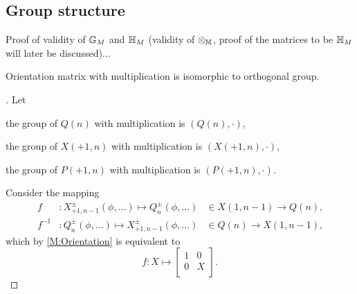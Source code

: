 \documentclass[stu, babel, american, biblatex, a4paper, leqno, draftall]{apa7}
\begin{document}
\subsection{Group structure}
Proof of validity of $\mathbb{G}_{M}$ and $\mathbb{H}_{M}$ (validity of $\otimes_{\mathbb{M}}$, proof of the matrices to be $\mathbb{H}_{M}$ will later be discussed)...
\begin{lemma}\label{M:Orientation:Group}
    Orientation matrix with multiplication
    is isomorphic to orthogonal group.
\end{lemma}
\begin{proof}[]
    Let
    \begin{APAitemize}
        \item the group of $Q\left(n\right)$ with multiplication is $\left(Q\left(n\right),\cdot\right)$,
        \item the group of $X\left(+1,n\right)$ with multiplication is $\left(X\left(+1,n\right),\cdot\right)$,
        \item the group of $P\left(+1,n\right)$ with multiplication is $\left(P\left(+1,n\right),\cdot\right)$.
    \end{APAitemize}

    Consider the mapping
    \begin{align*}
        f      & : X^{\pm}_{+1,n-1}\left(\phi,\dots\right) \mapsto Q^{\pm}_{n}\left(\phi,\dots\right) & \in X\left(1,n-1\right) \to Q\left(n\right) \text{,} \\
        f^{-1} & : Q^{\pm}_{n}\left(\phi,\dots\right) \mapsto X^{\pm}_{+1,n-1}\left(\phi,\dots\right) & \in Q\left(n\right) \to X\left(1,n-1\right) \text{,}
    \end{align*}
    which by \cref{M:Orientation} is equivalent to
    \begin{equation} \label{M:Point:Orientation:Isomorphism}
        f : X \mapsto \begin{bmatrix}
            1 & 0 \\
            0 & X \\
        \end{bmatrix}
        \text{.}
    \end{equation}


\end{proof}
\end{document}
